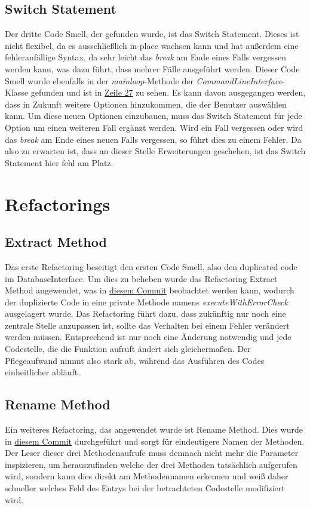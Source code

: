 \subsection{Switch Statement}
Der dritte Code Smell, der gefunden wurde, ist das Switch Statement. Dieses ist nicht flexibel, da es ausschließlich in-place wachsen kann und hat außerdem eine fehleranfällige Syntax, da sehr leicht das \textit{break} am Ende eines Falls vergessen werden kann, was dazu führt, dass mehrer Fälle ausgeführt werden. Dieser Code Smell wurde ebenfalls in der \textit{mainloop}-Methode der \textit{CommandLineInterface}-Klasse gefunden und ist in \href{https://github.com/moorts/Morik/blob/5fad45957d77585d88bf3330cab6004315e6e2e3/src/plugins/ui/CommandLineInterface.cpp#L27}{Zeile 27} zu sehen. Es kann davon ausgegangen werden, dass in Zukunft weitere Optionen hinzukommen, die der Benutzer auswählen kann. Um diese neuen Optionen einzubauen, muss das Switch Statement für jede Option um einen weiteren Fall ergänzt werden. Wird ein Fall vergessen oder wird das \textit{break} am Ende eines neuen Falls vergessen, so führt dies zu einem Fehler. Da also zu erwarten ist, dass an dieser Stelle Erweiterungen geschehen, ist das Switch Statement hier fehl am Platz.

\section{Refactorings}
\subsection{Extract Method}
Das erste Refactoring beseitigt den ersten Code Smell, also den duplicated code im DatabaseInterface. Um dies zu beheben wurde das Refactoring Extract Method angewendet, was in \href{https://github.com/moorts/Morik/commit/09ea85004227950dbf7d30e7bb6de26f92b1ea85}{diesem Commit} beobachtet werden kann, wodurch der duplizierte Code in eine private Methode namens \textit{executeWithErrorCheck} ausgelagert wurde. Das Refactoring führt dazu, dass zukünftig nur noch eine zentrale Stelle anzupassen ist, sollte das Verhalten bei einem Fehler verändert werden müssen. Entsprechend ist nur noch eine Änderung notwendig und jede Codestelle, die die Funktion aufruft ändert sich gleichermaßen. Der Pflegeaufwand nimmt also stark ab, während das Ausführen des Codes einheitlicher abläuft.

\subsection{Rename Method}
Ein weiteres Refactoring, das angewendet wurde ist Rename Method. Dies wurde in \href{https://github.com/moorts/Morik/commit/e807014b1ae894640a8a87f2765fa2ba5d95ea19}{diesem Commit} durchgeführt und sorgt für eindeutigere Namen der Methoden. Der Leser dieser drei Methodenaufrufe muss demnach nicht mehr die Parameter inspizieren, um herauszufinden welche der drei Methoden tatsächlich aufgerufen wird, sondern kann dies direkt am Methodennamen erkennen und weiß daher schneller welches Feld des Entrys bei der betrachteten Codestelle modifiziert wird.
